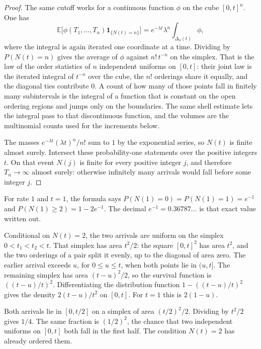 \begin{proof}
The same cutoff works for a continuous function $\phi$ on the cube $[0,t]^n$. One has
\[
 \mathbb E\bigl[\phi(T_1,\ldots,T_n)\mathbf 1_{\{N(t)=n\}}\bigr]
 =e^{-\lambda t}\lambda^n\int_{\Delta_n(t)}\phi,
\]
where the integral is again iterated one coordinate at a time. Dividing by $P(N(t)=n)$ gives the average of $\phi$ against $n!\,t^{-n}$ on the simplex. That is the law of the order statistics of $n$ independent uniforms on $[0,t]$: their joint law is the iterated integral of $t^{-n}$ over the cube, the $n!$ orderings share it equally, and the diagonal ties contribute $0$. A count of how many of those points fall in finitely many subintervals is the integral of a function that is constant on the open ordering regions and jumps only on the boundaries. The same shell estimate lets the integral pass to that discontinuous function, and the volumes are the multinomial counts used for the increments below.

The masses $e^{-\lambda t}(\lambda t)^n/n!$ sum to $1$ by the exponential series, so $N(t)$ is finite almost surely. Intersect these probability-one statements over the positive integers $t$. On that event $N(j)$ is finite for every positive integer $j$, and therefore $T_n\to\infty$ almost surely: otherwise infinitely many arrivals would fall before some integer $j$.
\end{proof}

For rate $1$ and $t=1$, the formula says $P(N(1)=0)=P(N(1)=1)=e^{-1}$ and $P(N(1)\ge2)=1-2e^{-1}$. The decimal $e^{-1}=0.36787\ldots$ is that exact value written out.

Conditional on $N(t)=2$, the two arrivals are uniform on the simplex $0<t_1<t_2<t$. That simplex has area $t^2/2$: the square $[0,t]^2$ has area $t^2$, and the two orderings of a pair split it evenly, up to the diagonal of area zero. The earlier arrival exceeds $u$, for $0\le u\le t$, when both points lie in $(u,t]$. The remaining simplex has area $(t-u)^2/2$, so the survival function is $((t-u)/t)^2$. Differentiating the distribution function $1-((t-u)/t)^2$ gives the density $2(t-u)/t^2$ on $[0,t]$. For $t=1$ this is $2(1-u)$.

Both arrivals lie in $[0,t/2]$ on a simplex of area $(t/2)^2/2$. Dividing by $t^2/2$ gives $1/4$. The same fraction is $(1/2)^2$, the chance that two independent uniforms on $[0,t]$ both fall in the first half. The condition $N(t)=2$ has already ordered them.

